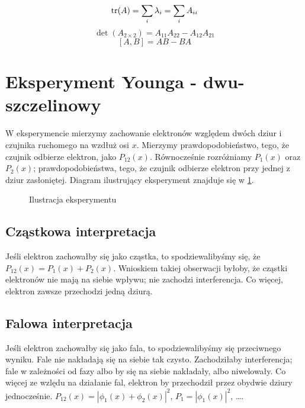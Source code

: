 \documentclass{../notatki}
\begin{document}
$$
\trace(A) = \sum_{i} \lambda_i = \sum_{i} A_{ii}
$$
$$
\det(A_{2 \times 2}) = A_{11}A_{22} - A_{12}A_{21}
$$
$$
[A, B] = AB - BA
$$

\section{Eksperyment Younga - dwu-szczelinowy}

W eksperymencie mierzymy zachowanie elektronów względem
dwóch dziur i czujnika ruchomego na wzdłuż osi $x$. Mierzymy prawdopodobieństwo,
tego, że czujnik odbierze elektron, jako $P_{12}(x)$. Równocześnie rozróżniamy
$P_1(x)$ oraz $P_2(x)$; prawdopodobieństwa, tego, że czujnik odbierze
elektron przy jednej z dziur zasłoniętej. Diagram ilustrujący eksperyment
znajduje się w \cref{fig:young}.
\begin{figure}[H]
  \centering
  \caption{Ilustracja eksperymentu}
  \label{fig:young}
\end{figure}

\subsection{Cząstkowa interpretacja}

Jeśli elektron zachowałby się jako cząstka, to spodziewalibyśmy się, że
$P_{12}(x) = P_1(x) + P_2(x)$. Wnioskiem takiej obserwacji byłoby, że
cząstki elektronów nie mają na siebie wpływu; nie zachodzi interferencja.
Co więcej, elektron zawsze przechodzi jedną dziurą.

\subsection{Falowa interpretacja}

Jeśli elektron zachowałby się jako fala, to spodziewalibyśmy się
przeciwnego wyniku. Fale nie nakładają się na siebie tak czysto.
Zachodziłaby interferencja; fale w zależności od fazy albo by się na siebie
nakładały, albo niwelowały. Co więcej ze wzlędu na działanie fal, elektron
by przechodził przez obydwie dziury jednocześnie.
$P_{12}(x) = |\phi_1(x) + \phi_2(x)|^2$,
$P_1 = |\phi_1(x)|^2$, \dots.
\end{document}
